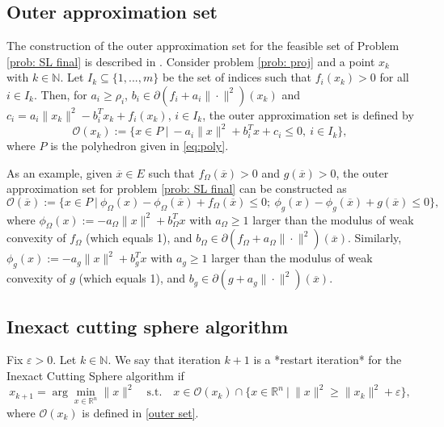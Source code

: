 \documentclass[12pt]{amsart}
\theoremstyle{plain}
\theoremstyle{definition}
\begin{document}
\subsection{Outer approximation set}

The construction of the outer approximation set for the feasible set of Problem \eqref{prob: SL final} is described in \cite[Definition 1]{bednarczuk2026outer}. Consider problem \eqref{prob: proj} and a point \(x_k\) with \(k \in \mathbb{N}\). Let \(I_k \subseteq \{1,...,m\}\) be the set of indices such that \(f_i(x_k) > 0\) for all \(i \in I_k\). Then, for \(a_i \ge \rho_i\), \(b_i \in \partial (f_i + a_i \|\cdot\|^2)(x_k)\) and \(c_i = a_i \|x_k\|^2 - b_i^T x_k + f_i(x_k)\), \(i \in I_k\), the outer approximation set is defined by
\begin{equation}
\label{outer set}
\mathcal{O}(x_k) := \bigl\{ x \in P \ \big|\ 
-a_i \|x\|^2 + b_i^T x + c_i \le 0,\ i \in I_k \bigr\},
\end{equation}
where \(P\) is the polyhedron given in \eqref{eq:poly}.

As an example, given \(\overline{x} \in E\) such that \(f_\Omega(\overline{x}) > 0\) and \(g(\overline{x}) > 0\), the outer approximation set for problem \eqref{prob: SL final} can be constructed as
\begin{equation}
\label{outer set ex}
\mathcal{O}(\overline{x}) := \bigl\{ x \in P \ \big|\ 
\phi_\Omega(x) - \phi_\Omega(\overline{x}) + f_\Omega(\overline{x}) \le 0;\ 
\phi_g(x) - \phi_g(\overline{x}) + g(\overline{x}) \le 0 \bigr\},
\end{equation}
where \(\phi_\Omega(x) := -a_\Omega \|x\|^2 + b_\Omega^T x\) with \(a_\Omega \ge 1\) larger than the modulus of weak convexity of \(f_\Omega\) (which equals 1), and \(b_\Omega \in \partial (f_\Omega + a_\Omega \|\cdot\|^2)(\overline{x})\). Similarly, \(\phi_g(x) := -a_g \|x\|^2 + b_g^T x\) with \(a_g \ge 1\) larger than the modulus of weak convexity of \(g\) (which equals 1), and \(b_g \in \partial (g + a_g \|\cdot\|^2)(\overline{x})\).

\subsection{Inexact cutting sphere algorithm}

Fix \(\varepsilon > 0\). Let \(k \in \mathbb{N}\). We say that iteration \(k+1\) is a *restart iteration* for the Inexact Cutting Sphere algorithm \cite[Algorithm 3]{bednarczuk2026outer} if
\begin{equation}
\label{it: restart}
x_{k+1} = \arg\min_{x \in \mathbb{R}^n} \|x\|^2 
\quad \text{s.t.} \quad 
x \in \mathcal{O}(x_k) \cap \bigl\{ x \in \mathbb{R}^n \ \big|\ \|x\|^2 \ge \|x_k\|^2 + \varepsilon \bigr\},
\end{equation}
where \(\mathcal{O}(x_k)\) is defined in \eqref{outer set}.
\end{document}
